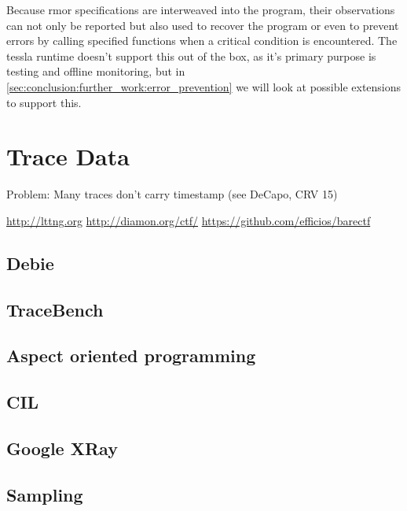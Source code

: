 Because \gls{rmor} specifications are interweaved into the program, their observations can not only be reported but also used to recover the program or even to prevent errors by calling specified functions when a critical condition is encountered.
The \gls{tessla} runtime doesn't support this out of the box, as it's primary purpose is testing and offline monitoring, but in \cref{sec:conclusion:further_work:error_prevention} we will look at possible extensions to support this.


\section{Trace Data}
\label{sec:system:traces}

Problem: Many traces don't carry timestamp (see DeCapo, CRV 15)

\url{http://lttng.org}
\url{http://diamon.org/ctf/}
\url{https://github.com/efficios/barectf}
\subsection{Debie}
\subsection{TraceBench}
\subsection{Aspect oriented programming}
\subsection{CIL}
\subsection{Google XRay}
\subsection{Sampling}
